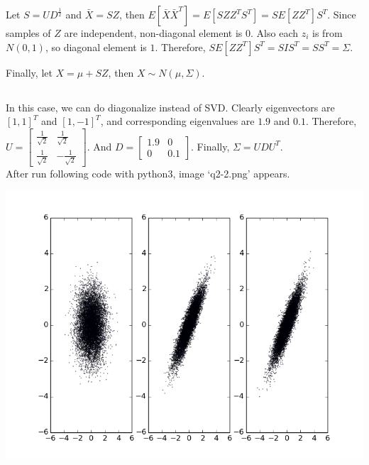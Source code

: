 \documentclass{article}
\begin{document}
Let $S=UD^{\frac{1}{2}}$ and $\bar{X}=SZ$, then
$E[\bar{X}\bar{X}^T]
= E[SZZ^TS^T]
= SE[ZZ^T]S^T$.
Since samples of $Z$ are independent, non-diagonal element is $0$.
Also each $z_i$ is from $N(0,1)$, so diagonal element is $1$.
Therefore, $SE[ZZ^T]S^T = SIS^T = SS^T = \Sigma$.

Finally, let $X = \mu + SZ$, then $X \sim N(\mu, \Sigma)$.

\subsection{}
In this case, we can do diagonalize instead of SVD.
Clearly eigenvectors are $[1,1]^T$ and $[1,-1]^T$,
and corresponding eigenvalues are $1.9$ and $0.1$.
Therefore,
$U =
\begin{bmatrix}
    \frac{1}{\sqrt{2}} & \frac{1}{\sqrt{2}} \\
    \frac{1}{\sqrt{2}} & -\frac{1}{\sqrt{2}}
\end{bmatrix}$.
And
$D =
\begin{bmatrix}
    1.9 & 0 \\
    0 & 0.1
\end{bmatrix}$.
Finally, $\Sigma = UDU^T$. \\

After run following code with python3, image `q2-2.png' appears.



\begin{center}
    \includegraphics[totalheight=0.5\textheight]{./q2-2.png}
\end{center}
\end{document}
